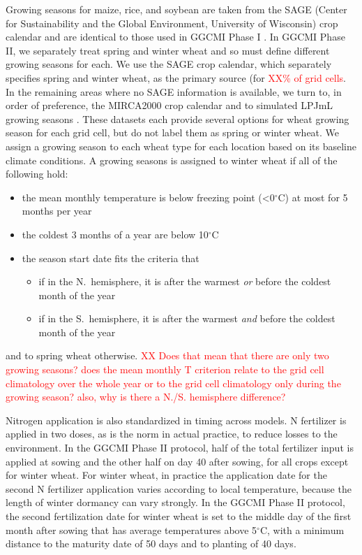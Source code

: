 \documentclass[gmd, manuscript]{copernicus} %
\begin{document}
Growing seasons for maize, rice, and soybean are taken from the SAGE (Center for Sustainability and the Global Environment, University of Wisconsin) crop calendar \citep{Sacks2010} and are identical to those used in GGCMI Phase I \citep{Elliott2015}.
In GGCMI Phase II, we separately treat spring and winter wheat and so must define different growing seasons for each.
We use the SAGE crop calendar, which separately specifies spring and winter wheat, as the primary source (for \textcolor{red}{XX\% of grid cells}. 
In the remaining areas where no SAGE information is available, we turn to, in order of preference, the MIRCA2000 crop calendar \citep{Portmann2010} and to simulated LPJmL growing seasons \citep{waha2012climate}.  
These datasets each provide several options for wheat growing season for each grid cell, but do not label them as spring or winter wheat. We assign a growing season to each wheat type for each location based on its baseline climate conditions. 
A growing seasons is assigned to winter wheat if all of the following hold:
\begin{itemize} %
\item the mean monthly temperature is below freezing point (<0$^\circ$C) at most for 5 months per year 
\item the coldest 3 months of a year are below 10$^\circ$C
\item the season start date fits the criteria that
	\begin{itemize} 
		\item if in the N.\ hemisphere, it is after the warmest \textit{or} before the coldest month of the year 
		\item if in the S.\ hemisphere, it is after the warmest \textit{and} before the coldest month of the year 
    \end{itemize}
\end{itemize}
and to spring wheat otherwise. 
\textcolor{red}{XX Does that mean that there are only two growing seasons? does the mean monthly T criterion relate to the grid cell climatology over the whole year or to the grid cell climatology only during the growing season? also, why is there a N./S. hemisphere difference?}

Nitrogen application is also standardized in timing across models. 
N fertilizer is applied in two doses, as is the norm in actual practice, to reduce losses to the environment. 
In the GGCMI Phase II protocol, half of the total fertilizer input is applied at sowing and the other half on day 40 after sowing, for all crops except for winter wheat. 
For winter wheat, in practice the application date for the second N fertilizer application varies according to local temperature, because the length of winter dormancy can vary strongly. 
In the GGCMI Phase II protocol, the second fertilization date for winter wheat is set to the middle day of the first month after sowing that has average temperatures above 5$^\circ$C, with a minimum distance to the maturity date of 50 days and to planting of 40 days. 
\end{document}
